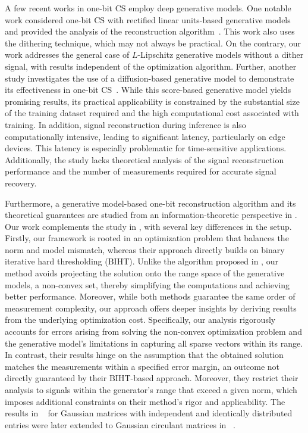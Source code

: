 \documentclass[journal]{IEEEtran}
\begin{document}
A few recent works in one-bit CS employ deep generative models. One notable work considered one-bit CS with rectified linear units-based generative models and provided the analysis of the reconstruction algorithm~\cite{qiu2020robust}. This work also uses the dithering technique, which may not always be practical. On the contrary, our work addresses the general case of $L$-Lipschitz generative models without a dither signal, with results independent of the optimization algorithm. Further, another study investigates the use of a diffusion-based generative model to demonstrate its effectiveness in one-bit CS~\cite{meng2022quantized}. While this score-based generative model yields promising results, its practical applicability is constrained by the substantial size of the training dataset required and the high computational cost associated with training. In addition, signal reconstruction during inference is also computationally intensive, leading to significant latency, particularly on edge devices. This latency is especially problematic for time-sensitive applications. Additionally, the study lacks theoretical analysis of the signal reconstruction performance and the number of measurements required for accurate signal recovery. 

Furthermore, a generative model-based one-bit reconstruction algorithm and its theoretical guarantees are studied from an information-theoretic perspective in \cite{liu2020sample}. Our work complements the study in \cite{liu2020sample}, with several key differences in the setup. Firstly, our framework is rooted in an optimization problem that balances the norm and model mismatch, whereas their approach directly builds on binary iterative hard thresholding (BIHT). Unlike the algorithm proposed in \cite{liu2020sample}, our method avoids projecting the solution onto the range space of the generative models, a non-convex set, thereby simplifying the computations and achieving better performance. Moreover, while both methods guarantee the same order of measurement complexity, our approach offers deeper insights by deriving results from the underlying optimization cost. Specifically, our analysis rigorously accounts for errors arising from solving the non-convex optimization problem and the generative model's limitations in capturing all sparse vectors within its range. In contrast, their results hinge on the assumption that the obtained solution matches the measurements within a specified error margin, an outcome not directly guaranteed by their BIHT-based approach. Moreover, they restrict their analysis to signals within the generator's range that exceed a given norm, which imposes additional constraints on their method's rigor and applicability. The results in ~\cite{liu2020sample} for Gaussian matrices with independent and identically distributed entries were later extended to Gaussian circulant matrices in ~\cite{liu2021robust}.
\end{document}
